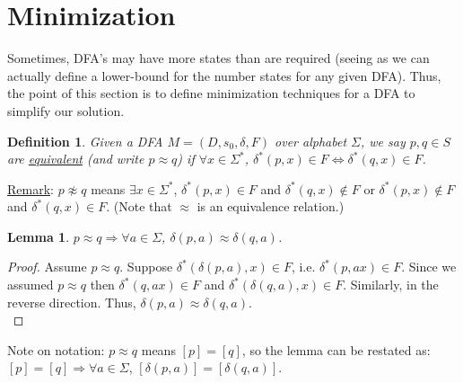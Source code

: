 \documentclass{article}
\newtheorem{definition}{Definition}
\newtheorem{lemma}{Lemma}
\begin{document}
\section{Minimization}
Sometimes, DFA's may have more states than are required (seeing as we can actually define a lower-bound for the number states for any given DFA). Thus, the point of this section is to define minimization techniques for a DFA to simplify our solution.
\begin{definition}
Given a DFA $M = (D, s_0, \delta, F)$ over alphabet $\Sigma$, we say $p,q \in S$ are \underline{equivalent} (and write $p \approx q$) if $\forall x \in \Sigma^*$, $\delta^*(p,x) \in F \iff \delta^*(q,x) \in F$.
\end{definition}

\noindent \underline{Remark}: $p \not\approx q$ means $\exists x \in \Sigma^*$, $\delta^*(p,x) \in F$ and $\delta^*(q,x) \not\in F$ or $\delta^*(p,x) \notin F$ and $\delta^*(q,x) \in F$. (Note that $\approx$ is an equivalence relation.)
\begin{lemma}
$p \approx q \Rightarrow \forall a \in \Sigma$, $\delta(p,a) \approx \delta(q,a)$.
\end{lemma}
\begin{proof}
Assume $p \approx q$. Suppose $\delta^*(\delta(p,a),x) \in F$, i.e. $\delta^*(p,ax) \in F$. Since we assumed $p \approx q$ then $\delta^*(q,ax) \in F$ and $\delta^*(\delta(q,a),x) \in F$. Similarly, in the reverse direction. Thus, $\delta(p,a) \approx \delta(q,a)$.\\
\end{proof}
\noindent Note on notation: $p \approx q$ means $[p] = [q]$, so the lemma can be restated as: $[p] = [q] \Rightarrow \forall a \in \Sigma$, $[\delta(p,a)] = [\delta(q,a)]$.
\end{document}
